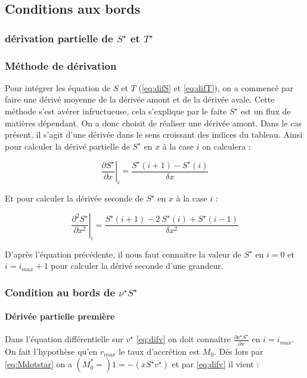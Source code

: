 \subsection{Conditions aux bords}

\subsubsection{dérivation partielle de $S^{\star}$ et $T^{\star}$}

\subsubsection{Méthode de dérivation}

Pour intégrer les équation de $S$ et $T$ (\eqref{eq:difS} et \eqref{eq:difT}), on a commencé par faire une dérivé moyenne de la dérivée amont et de la dérivée avale. Cette méthode s'est avérer infructueuse, cela s'explique par le faite $S^{\star}$ est un flux de matières dépendant. On a donc choisit de réaliser une dérivée amont. Dans le cas présent, il s'agit d'une dérivée dans le sens croissant des indices du tableau. Ainsi pour calculer la dérivé partielle de $S^{\star}$ en $x$ à la case $i$ on calculera :

\begin{equation}
  \left. \frac{\partial S^{\star}}{\partial x} \right|_i = \frac{S^{\star}(i+1)-S^{\star}(i)}{\delta x} 
\end{equation}

Et pour calculer la dérivée seconde de $S^{\star}$ en $x$ à la case $i$ :

\begin{equation}
  \left. \frac{\partial^2 S^{\star}}{\partial x^2}\right|_i=\frac{S^{\star}(i+1)-2\ S^{\star}(i) +S^{\star}(i-1)}{\delta x^2} 
\end{equation}

D'après l'équation précédente, il nous faut connaitre la valeur de $S^{\star}$ en $i=0$ et $i=i_{max}+1$ pour calculer la dérivé seconde d'une grandeur.

\subsubsection{Condition au bords de $\nu^{\star}S^{\star}$}
 
\paragraph{Dérivée partielle première}
Dans l'équation différentielle sur $v^{\star}$ \eqref{eq:difv} on doit connaître $\frac{\partial \nu^{\star} S^{\star}}{\partial x}$ en $i=i_{max}$. On fait l'hypothèse qu'en $r_{max}$ le taux d'accrétion est $\dot{M}_0$. Dés lors par \eqref{eq:Mdotstar} on a $(\dot{M}^{\star}_0=)1 = -(x S^{\star}v^{\star})$ et par \eqref{eq:difv} il vient :

